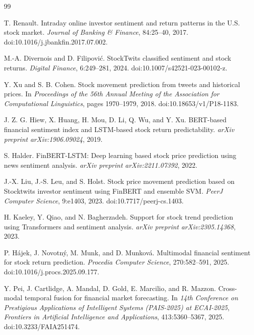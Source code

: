 \documentclass[10pt,twocolumn]{article}
\begin{document}
\begin{thebibliography}{99}

T. Renault.
\newblock Intraday online investor sentiment and return patterns in the U.S. stock market.
\newblock \textit{Journal of Banking \& Finance}, 84:25--40, 2017.
\newblock doi:10.1016/j.jbankfin.2017.07.002.

M.-A. Divernois and D. Filipovi\'{c}.
\newblock StockTwits classified sentiment and stock returns.
\newblock \textit{Digital Finance}, 6:249--281, 2024.
\newblock doi:10.1007/s42521-023-00102-z.

Y. Xu and S. B. Cohen.
\newblock Stock movement prediction from tweets and historical prices.
\newblock In \textit{Proceedings of the 56th Annual Meeting of the Association for Computational Linguistics}, pages 1970--1979, 2018.
\newblock doi:10.18653/v1/P18-1183.

J. Z. G. Hiew, X. Huang, H. Mou, D. Li, Q. Wu, and Y. Xu.
\newblock BERT-based financial sentiment index and LSTM-based stock return predictability.
\newblock \textit{arXiv preprint arXiv:1906.09024}, 2019.

S. Halder.
\newblock FinBERT-LSTM: Deep learning based stock price prediction using news sentiment analysis.
\newblock \textit{arXiv preprint arXiv:2211.07392}, 2022.

J.-X. Liu, J.-S. Leu, and S. Holst.
\newblock Stock price movement prediction based on Stocktwits investor sentiment using FinBERT and ensemble SVM.
\newblock \textit{PeerJ Computer Science}, 9:e1403, 2023.
\newblock doi:10.7717/peerj-cs.1403.

H. Kaeley, Y. Qiao, and N. Bagherzadeh.
\newblock Support for stock trend prediction using Transformers and sentiment analysis.
\newblock \textit{arXiv preprint arXiv:2305.14368}, 2023.

P. H\'{a}jek, J. Novotn\'{y}, M. Munk, and D. Munkov\'{a}.
\newblock Multimodal financial sentiment for stock return prediction.
\newblock \textit{Procedia Computer Science}, 270:582--591, 2025.
\newblock doi:10.1016/j.procs.2025.09.177.

Y. Pei, J. Cartlidge, A. Mandal, D. Gold, E. Marcilio, and R. Mazzon.
\newblock Cross-modal temporal fusion for financial market forecasting.
\newblock In \textit{14th Conference on Prestigious Applications of Intelligent Systems (PAIS-2025) at ECAI-2025}, \textit{Frontiers in Artificial Intelligence and Applications}, 413:5360--5367, 2025.
\newblock doi:10.3233/FAIA251474.


\end{thebibliography}
\end{document}
